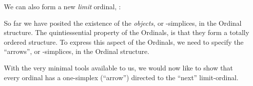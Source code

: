 \documentclass[a4paper]{amsart}
\begin{document}
We can also form a new \emph{limit} ordinal, \limitOrd{\alpha}:

\begin{deAxiom}
\hypothesis{\Gamma}{\judgement{\alpha}{\Ordinal}}
\conclusion{\Gamma}{\judgement{\limitOrd{\alpha}}{\Ordinal}}
\end{deAxiom}

So far we have posited the existence of the \emph{objects}, or \zero-simplices,
in the Ordinal structure. The quintiessential property of the Ordinals, is that
they form a totally ordered structure. To express this aspect of the Ordinals,
we need to specify the ``arrows'', or \one-simplices, in the Ordinal structure.

\begin{deAxiom}
\hypothesis{\Gamma}{\judgement{\alpha}{\Ordinal_{\cdot}}}
\conclusion{\Gamma}{
  \judgement{\arrow{\alpha}{\successor{\alpha}}}{\Ordinal_{\rightarrow}}
}
\end{deAxiom}

\begin{deAxiom}
\conclusion{}{
  \judgement{\arrow{\zero}{\limitOrd{\zero}}}{\arrow{\Ordinal}{\Ordinal}}
}
\end{deAxiom}

\begin{deAxiom}
\hypothesis{\Gamma}{\judgement{\alpha}{\Ordinal_{\cdot}}}
\conclusion{\Gamma}{
  \judgement{\arrow{\limitOrd{\alpha}}{\limitOrd{\successor{\alpha}}}}{\Ordinal_{\rightarrow}}
}
\end{deAxiom}

\begin{deAxiom}
\hypothesis{\Gamma}{\judgement{\alpha}{\Ordinal_{\cdot}}}
\hypothesis{\Gamma}{\judgement{\beta}{\Ordinal_{\cdot}}}
\hypothesis{\Gamma}{\judgement{\arrow{\alpha}{\successor{\alpha}}}{\Ordinal_{\rightarrow}}}
\hypothesis{\Gamma}{\judgement{\arrow{\alpha}{\limitOrd{\beta}}}{\Ordinal_{\rightarrow}}}
\conclusion{\Gamma}{
  \judgement{\arrow{\successor{\alpha}}{\limitOrd{\beta}}}{\Ordinal_{\rightarrow}}
}
\end{deAxiom}


With the very minimal tools available to us, we would now like to show that
every ordinal has a one-simplex (``arrow'') directed to the ``next''
limit-ordinal.
\end{document}
